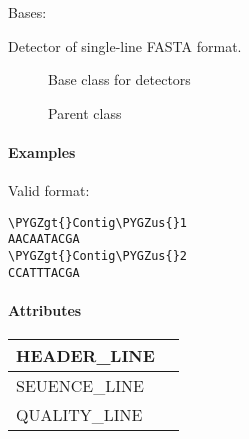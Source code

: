 \documentclass[letterpaper,10pt,english]{sphinxmanual}
\def\PYGZus{\char`\_}
\def\PYGZgt{\char`\>}
\begin{document}
\begin{fulllineitems}
\label{fseq.reading:fseq.reading.seq_encoder.FastaSingleline}
Bases: {\hyperref[fseq.reading:fseq.reading.seq_encoder.FastaMultiline]{}}

Detector of single-line FASTA format.



\begin{description}
\item[{{\hyperref[fseq.reading:fseq.reading.seq_encoder.SeqFormat]{}}}] \leavevmode
Base class for detectors

\item[{{\hyperref[fseq.reading:fseq.reading.seq_encoder.FastaMultiline]{}}}] \leavevmode
Parent class

\end{description}


\paragraph{Examples}

Valid format:

\begin{Verbatim}[commandchars=\\\{\}]
\PYGZgt{}Contig\PYGZus{}1
AACAATACGA
\PYGZgt{}Contig\PYGZus{}2
CCATTTACGA
\end{Verbatim}
\paragraph{Attributes}

\begin{tabulary}{\linewidth}{|L|L|}
\hline

HEADER\_LINE
 & \\
\hline
SEUENCE\_LINE
 & \\
\hline
QUALITY\_LINE
 & \\
\hline\end{tabulary}


\begin{fulllineitems}
\label{fseq.reading:fseq.reading.seq_encoder.FastaSingleline.HEADER_LINE}
\end{fulllineitems}


\end{fulllineitems}
\end{document}
